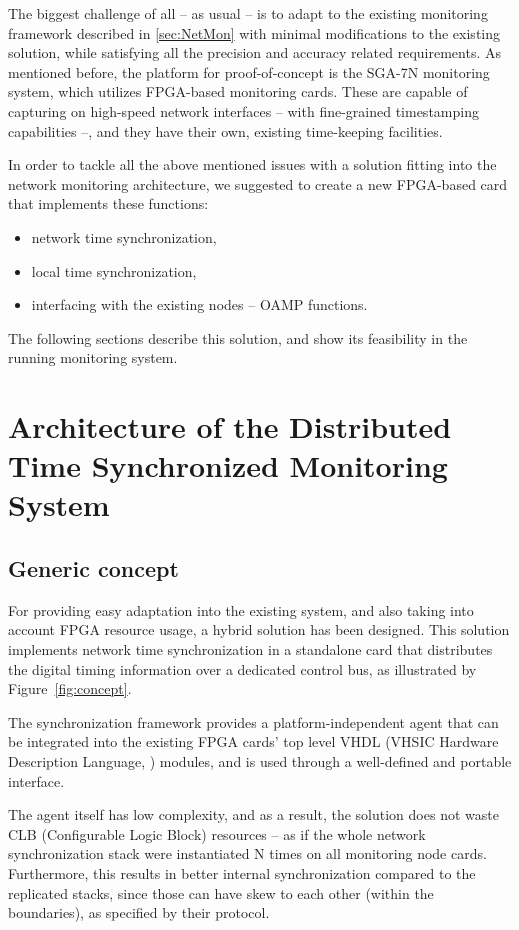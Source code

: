 \documentclass[journal]{IEEEtran}
\begin{document}
The biggest challenge of all -- as usual -- is to adapt to the existing monitoring framework described in
\ref{sec:NetMon}
with minimal modifications to the existing solution, while satisfying all the precision and accuracy related requirements.
As mentioned before, the platform for proof-of-concept is the SGA-7N monitoring system, which utilizes FPGA-based monitoring cards. These are capable of capturing on high-speed network interfaces -- with fine-grained timestamping capabilities --, and they have their own, existing time-keeping facilities.

In order to tackle all the above mentioned issues with a solution fitting into the network monitoring architecture, we suggested to create a new FPGA-based card that implements these functions:
\begin{itemize}
    \item network time synchronization,
    \item local time synchronization,
    \item interfacing with the existing nodes -- OAMP functions.
\end{itemize}

The following sections describe this solution, and show its feasibility in the running monitoring system.

\IEEEpubidadjcol %

\section{Architecture of the Distributed Time Synchronized Monitoring System}

\subsection{Generic concept}
For providing easy adaptation into the existing system, and also taking into account FPGA resource usage, a hybrid
solution
has been designed. This solution implements network time synchronization in a standalone card that distributes the digital timing
information over a dedicated control bus, as illustrated by Figure~\ref{fig:concept}.

The synchronization framework provides a platform-independent agent that
can be integrated into the existing FPGA cards' top level VHDL (VHSIC Hardware Description Language, \cite{VHDL_standard}) modules, and is used through a well-defined and portable interface.

The agent itself has low complexity, and as a result, the solution does not waste CLB (Configurable Logic Block) resources -- as if the whole network
synchronization stack were instantiated N times on all monitoring node cards. Furthermore, this results in better internal
synchronization
compared to the replicated stacks, since those can have skew to each other (within the boundaries), as specified by their
protocol.
\end{document}
